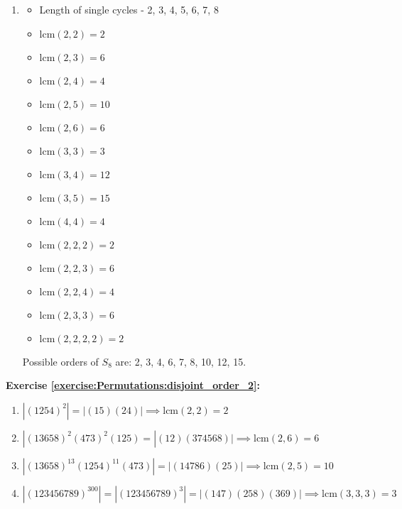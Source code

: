 \begin{enumerate}[{a.}]
\item
\begin{multicols}{2}
	\begin{itemize}
	\item
	Length of single cycles - 2, 3, 4, 5, 6, 7, 8
	
	\item
	$\mbox{lcm}(2, 2) = 2$
	
	\item
	$\mbox{lcm}(2, 3) = 6$
	
	\item
	$\mbox{lcm}(2, 4) = 4$
	
	\item
	$\mbox{lcm}(2, 5) = 10$
	
	\item
	$\mbox{lcm}(2, 6) = 6$
	
	\item
	$\mbox{lcm}(3, 3) = 3$
	
	\item
	$\mbox{lcm}(3, 4) = 12$
	
	\item
	$\mbox{lcm}(3, 5) = 15$
	
	\item
	$\mbox{lcm}(4, 4) = 4$
	
	\item
	$\mbox{lcm}(2, 2, 2) = 2$
	
	\item
	$\mbox{lcm}(2, 2, 3) = 6$
	
	\item
	$\mbox{lcm}(2, 2, 4) = 4$
	
	\item
	$\mbox{lcm}(2, 3, 3) = 6$
	
	\item
	$\mbox{lcm}(2, 2, 2, 2) = 2$
	\end{itemize}
	\end{multicols}
Possible orders of $S_8$ are: 2, 3, 4, 6, 7, 8, 10, 12, 15.
\end{enumerate}

\noindent\textbf{Exercise \ref{exercise:Permutations:disjoint_order_2}:}
\begin{enumerate}[{a.}]
\item
$|(1254)^2| = |(15)(24)| \implies \mbox{lcm}(2, 2) = 2$ 

\item
$|(13658)^2(473)^2(125) = |(12)(374568)| \implies \mbox{lcm}(2, 6) = 6$

\item
$|(13658)^{13}(1254)^{11}(473)| = |(14786)(25)| \implies \mbox{lcm}(2, 5) = 10$

\item
$|(123456789)^{300}| = |(123456789)^3| = |(147)(258)(369)| \implies \mbox{lcm}(3, 3, 3) = 3$
\end{enumerate}

